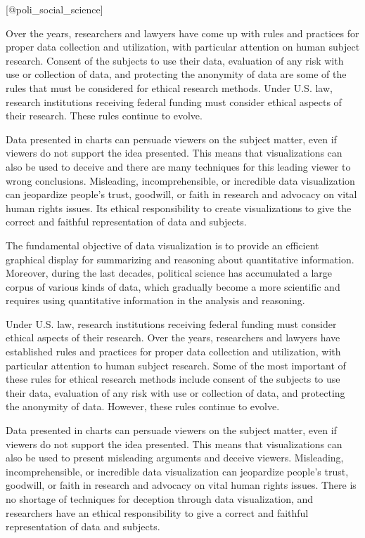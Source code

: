 \documentclass[]{book}
\theoremstyle{definition}
\theoremstyle{definition}
\theoremstyle{definition}
\theoremstyle{remark}
\begin{document}
{[}@poli\_social\_science{]}

Over the years, researchers and lawyers have come up with rules and
practices for proper data collection and utilization, with particular
attention on human subject research. Consent of the subjects to use
their data, evaluation of any risk with use or collection of data, and
protecting the anonymity of data are some of the rules that must be
considered for ethical research methods. Under U.S. law, research
institutions receiving federal funding must consider ethical aspects of
their research. These rules continue to evolve.

Data presented in charts can persuade viewers on the subject matter,
even if viewers do not support the idea presented. This means that
visualizations can also be used to deceive and there are many techniques
for this leading viewer to wrong conclusions. Misleading,
incomprehensible, or incredible data visualization can jeopardize
people's trust, goodwill, or faith in research and advocacy on vital
human rights issues. Its ethical responsibility to create visualizations
to give the correct and faithful representation of data and subjects.

The fundamental objective of data visualization is to provide an
efficient graphical display for summarizing and reasoning about
quantitative information. Moreover, during the last decades, political
science has accumulated a large corpus of various kinds of data, which
gradually become a more scientific and requires using quantitative
information in the analysis and reasoning.

Under U.S. law, research institutions receiving federal funding must
consider ethical aspects of their research. Over the years, researchers
and lawyers have established rules and practices for proper data
collection and utilization, with particular attention to human subject
research. Some of the most important of these rules for ethical research
methods include consent of the subjects to use their data, evaluation of
any risk with use or collection of data, and protecting the anonymity of
data. However, these rules continue to evolve.

Data presented in charts can persuade viewers on the subject matter,
even if viewers do not support the idea presented. This means that
visualizations can also be used to present misleading arguments and
deceive viewers. Misleading, incomprehensible, or incredible data
visualization can jeopardize people's trust, goodwill, or faith in
research and advocacy on vital human rights issues. There is no shortage
of techniques for deception through data visualization, and researchers
have an ethical responsibility to give a correct and faithful
representation of data and subjects.
\end{document}
